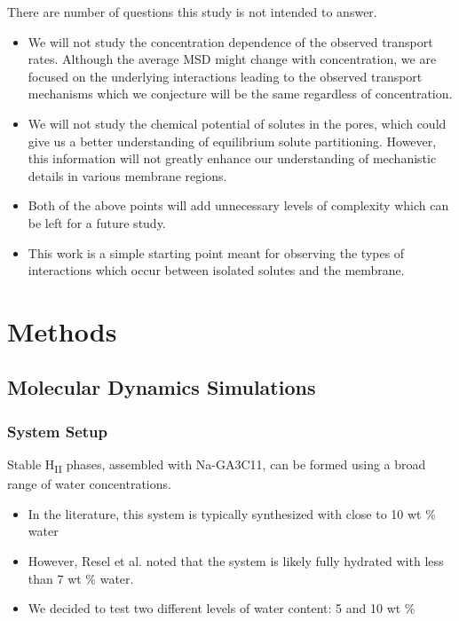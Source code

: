 \documentclass{article}
\begin{document}
  There are number of questions this study is not intended to answer.
  \begin{itemize}
    \item We will not study the concentration dependence of the observed
    transport rates. Although the average MSD might change with concentration,
    we are focused on the underlying interactions leading to the observed 
    transport mechanisms which we conjecture will be the same regardless of
    concentration.
    \item We will not study the chemical potential of solutes in the pores, which
    could give us a better understanding of equilibrium solute partitioning.
    However, this information will not greatly enhance our understanding of 
    mechanistic details in various membrane regions.
    \item Both of the above points will add unnecessary levels of complexity
    which can be left for a future study. 
    \item This work is a simple starting point meant for observing the types
    of interactions which occur between isolated solutes and the membrane.
  \end{itemize}

  \section{Methods}

  \subsection{Molecular Dynamics Simulations}
  
  \subsubsection*{System Setup}

  Stable H\textsubscript{II} phases, assembled with Na-GA3C11, can be formed
  using a broad range of water concentrations.
  \begin{itemize}
	\item In the literature, this system is typically synthesized with close
	to 10 wt \% water \cite{smith_ordered_1997, zhou_new_2007}
    \item However, Resel et al. noted that the system is likely fully 
	hydrated with less than 7 wt \% water. \cite{resel_h2-phase_2000}
	\item We decided to test two different levels of water content: 5 and 10 wt \%
  \end{itemize} 
\end{document}
